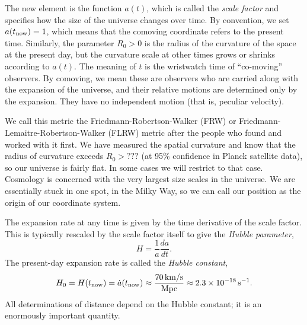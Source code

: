 The new element is the function $a(t)$, which is called the \textit{scale factor} and specifies how the size of the universe changes over time.  By convention, we set $a(t_{\rm now}) = 1$, which means that the comoving coordinate refers to the present time. Similarly, the parameter $R_0 > 0$ is the radius of the curvature of the space at the present day, but the curvature scale at other times grows or shrinks according to $a(t)$.  The meaning of $t$ is the wristwatch time of ``co-moving'' observers.  By comoving, we mean these are observers who are carried along with the expansion of the universe, and their relative motions are determined only by the expansion.  They have no independent motion (that is, peculiar velocity).

We call this metric the Friedmann-Robertson-Walker (FRW) or Friedmann-Lemaitre-Robertson-Walker (FLRW) metric after the people who found and worked with it first.  We have measured the spatial curvature and know that the radius of curvature exceeds $R_0 > ???$ (at 95\% confidence in Planck satellite data), so our universe is fairly flat.  In some cases we will restrict to that case.  Cosmology is concerned with the very largest size scales in the universe.  We are essentially stuck in one spot, in the Milky Way, so we can call our position as the origin of our coordinate system. 

The expansion rate at any time is given by the time derivative of the scale factor.  This is typically rescaled by the scale factor itself to give the \textit{Hubble parameter},
\begin{equation}
  H = \frac{1}{a} \frac{da}{dt}. 
\end{equation}
The present-day expansion rate is called the \textit{Hubble constant},
\begin{equation}
  H_0 = H(t_{\rm now}) = \dot a(t_{\rm now}) \approx \frac{70\,\mbox{km/s}}{\mbox{Mpc}} \approx 2.3\times 10^{-18}\,\mbox{s}^{-1}.
\end{equation}
All determinations of distance depend on the Hubble constant; it is an enormously important quantity.
  
